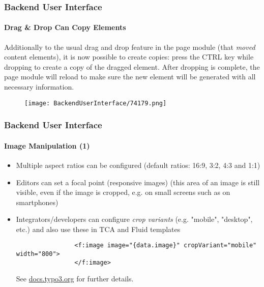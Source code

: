 \begin{frame}[fragile]
	\frametitle{Backend User Interface}
	\framesubtitle{Drag \& Drop Can Copy Elements}

	Additionally to the usual drag and drop feature in the page module (that \textit{moved} content elements),
	it is now possible to create copies: press the CTRL key while dropping to create a copy of the dragged
	element. After dropping is complete, the page module will reload to make sure the new element will be
	generated with all necessary information.

	\begin{figure}
		\texttt{[image: BackendUserInterface/74179.png]}
	\end{figure}

\end{frame}

\begin{frame}[fragile]
	\frametitle{Backend User Interface}
	\framesubtitle{Image Manipulation (1)}

	\begin{itemize}

		\item Multiple aspect ratios can be configured\newline
			\small(default ratios: 16:9, 3:2, 4:3 and 1:1)\normalsize

		\item Editors can set a focal point (responsive images)\newline
			\small
				(this area of an image is still visible, even if the image is cropped,
				e.g. on small screens such as on smartphones)
			\normalsize

		\item Integrators/developers can configure \textit{crop variants} (e.g. "mobile",
			"desktop", etc.) and also use these in TCA and Fluid templates

			\begin{lstlisting}
				<f:image image="{data.image}" cropVariant="mobile" width="800">
				</f:image>
			\end{lstlisting}

			See \href{https://docs.typo3.org/typo3cms/extensions/core/8-dev/Changelog/8.6/Feature-75880-ImplementMultipleCroppingVariantsInImageManipulationTool.html}{docs.typo3.org}
			for further details.

	\end{itemize}

\end{frame}

